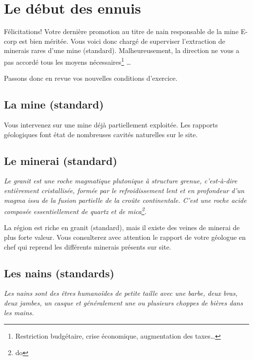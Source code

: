 
\newpage

\section{Le début des ennuis}

  Félicitations! Votre dernière promotion au titre de nain responsable de la
  mine E-corp est bien méritée. Vous voici donc chargé de superviser
  l'extraction de minerais rares d'une mine (standard). Malheureusement, la
  direction ne vous a pas accordé tous les moyens nécessaires\footnote{
  Restriction budgétaire, crise économique, augmentation des taxes\ldots{}}
  \ldots{}

  Passons donc en revue vos nouvelles conditions d'exercice.

\subsection{La mine (standard)}

  Vous intervenez sur une mine déjà partiellement exploitée. Les rapports
  géologiques font état de nombreuses cavités naturelles sur le site.

\subsection{Le minerai (standard)}

  \textit{Le granit est une roche magmatique plutonique à structure grenue,
  c'est-à-dire entièrement cristallisée, formée par le refroidissement lent et
  en profondeur d'un magma issu de la fusion partielle de la croûte
  continentale.  C'est une roche acide composée essentiellement de quartz et de
  mica\footnote{do}.}

  La région est riche en granit (standard), mais il existe des veines de
  minerai de plus forte valeur. Vous consulterez avec attention le rapport de
  votre géologue en chef qui reprend les différents minerais présents sur site.

\subsection{Les nains (standards)}

  \textit{Les nains sont des êtres humanoïdes de petite taille avec une barbe,
  deux bras, deux jambes, un casque et généralement une ou plusieurs choppes de
  bières dans les mains.}


